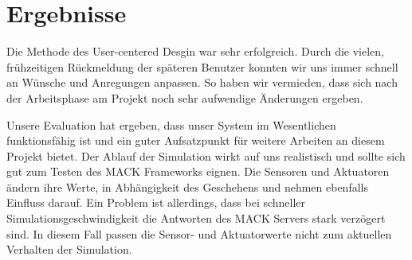 



\section{Ergebnisse}\label{sec:eva_results}

Die Methode des User-centered Desgin war sehr erfolgreich. Durch die vielen, frühzeitigen Rückmeldung der späteren Benutzer konnten wir uns immer schnell an Wünsche und Anregungen anpassen. So haben wir vermieden, dass sich nach der Arbeitsphase am Projekt noch sehr aufwendige Änderungen ergeben.

Unsere Evaluation hat ergeben, dass unser System im Wesentlichen funktionsfähig ist und ein guter Aufsatzpunkt für weitere Arbeiten an diesem Projekt bietet. Der Ablauf der Simulation wirkt auf uns realistisch und sollte sich gut zum Testen des MACK Frameworks eignen. Die Sensoren und Aktuatoren ändern ihre Werte, in Abhängigkeit des Geschehens und nehmen ebenfalls Einfluss darauf. Ein Problem ist allerdings, dass bei schneller Simulationsgeschwindigkeit die Antworten des MACK Servers stark verzögert sind. In diesem Fall passen die Sensor- und Aktuatorwerte nicht zum aktuellen Verhalten der Simulation.




